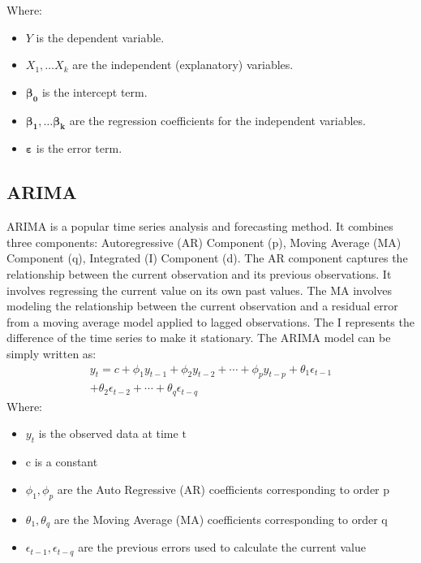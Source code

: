 \documentclass{ieeeojies}
\begin{document}
Where:
 \begin{itemize}
     \item $Y$ is the dependent variable.
     \item $X_1, \ldots X_k$ are the independent (explanatory) variables.
     \item $\boldsymbol{\beta_0}$ is the intercept term.
     \item $\boldsymbol{\beta_1}, \ldots \boldsymbol{\beta_k}$ are the regression coefficients for the independent variables.
     \item $\boldsymbol{\varepsilon}$ is the error term.
 \end{itemize}

\subsection{ARIMA}
\hspace{0.3cm}ARIMA is a popular time series analysis and forecasting method. It combines three components: Autoregressive (AR) Component (p), Moving Average (MA) Component (q), Integrated (I) Component (d). The AR component captures the relationship between the current observation and its previous observations. It involves regressing the current value on its own past values. The MA involves modeling the relationship between the current observation and a residual error from a moving average model applied to lagged observations. The I represents the difference of the time series to make it stationary.
The ARIMA model can be simply written as:
$$
\begin{gathered}
y_t=c+\phi_1 y_{t-1}+\phi_2 y_{t-2}+\cdots+\phi_p y_{t-p}+\theta_1 \epsilon_{t-1} \\
+\theta_2 \epsilon_{t-2}+\cdots+\theta_q \epsilon_{t-q}
\end{gathered}
$$
Where:
 \begin{itemize}
     \item $y_t$ is the observed data at time  $\mathrm{t}$
     \item $\mathrm{c}$ is a constant
     \item $\phi_1, \phi_p$ are the Auto Regressive (AR) coefficients corresponding to order $\mathrm{p}$
     \item $\theta_1, \theta_q$ are the  Moving Average (MA) coefficients corresponding to order $\mathrm{q}$
     \item $\epsilon_{t-1}, \epsilon_{t-q}$ 
    are the previous errors used to calculate the current value
 \end{itemize}
\end{document}
